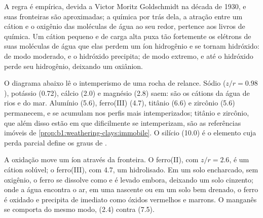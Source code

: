 A regra é empírica, devida a Victor Moritz Goldschmidt na década de 1930, e suas fronteiras são aproximadas; a química por trás dela, a atração entre um cátion e o oxigênio das moléculas de água ao seu redor, pertence aos livros de química. Um cátion pequeno e de carga alta puxa tão fortemente os elétrons de suas moléculas de água que elas perdem um íon hidrogênio e se tornam hidróxido: de modo moderado, e o hidróxido precipita; de modo extremo, e até o hidróxido perde seu hidrogênio, deixando um oxiânion.

O diagrama abaixo lê o intemperismo de uma rocha de relance. Sódio ($z/r = 0.98$), potássio (0.72), cálcio (2.0) e magnésio (2.8) saem: são os cátions da água de rios e do mar. Alumínio (5.6), ferro(III) (4.7), titânio (6.6) e zircônio (5.6) permanecem, e se acumulam nos perfis mais intemperizados; titânio e zircônio, que além disso estão em  que dificilmente se intemperizam, são as referências imóveis de \cref{prop:b1:weathering-clays:immobile}. O silício (10.0) é o elemento cuja perda parcial define os graus de .

A oxidação move um íon através da fronteira. O ferro(II), com $z/r = 2.6$, é um cátion solúvel; o ferro(III), com 4.7, um hidrolisado. Em um solo encharcado, sem oxigênio, o ferro se dissolve como  e é levado embora, deixando um solo cinzento; onde a água encontra o ar, em uma nascente ou em um solo bem drenado, o ferro é oxidado e precipita de imediato como óxidos vermelhos e marrons. O manganês se comporta do mesmo modo,  (2.4) contra  (7.5).

